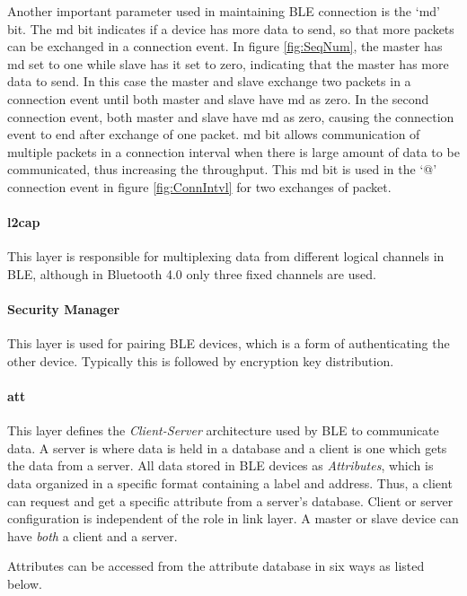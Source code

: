  
Another important parameter used in maintaining BLE connection is the `\gls{md}' bit. The \gls{md} bit indicates if a device has more data to send, so that more packets can be exchanged in a connection event. In figure \ref{fig:SeqNum}, the master has \gls{md} set to one while slave has it set to zero, indicating that the master has more data to send. In this case the master and slave exchange two packets in a connection event until both master and slave have \gls{md} as zero. In the second connection event, both master and slave have \gls{md} as zero, causing the connection event to end after exchange of one packet. \gls{md} bit allows communication of multiple packets in a connection interval when there is large amount of data to be communicated, thus increasing the throughput. This \gls{md} bit is used in the `@' connection event in figure \ref{fig:ConnIntvl} for two exchanges of packet.

\paragraph{\gls{l2cap}} This layer is responsible for multiplexing data from different logical channels in BLE, although in Bluetooth 4.0 only three fixed channels are used. 

\paragraph{Security Manager} This layer is used for pairing BLE devices, which is a form of authenticating the other device. Typically this is followed by encryption key distribution.

\paragraph{\gls{att}} This layer defines the \emph{Client-Server} architecture used by BLE to communicate data. A server is where data is held in a database and a client is one which gets the data from a server. All data stored in BLE devices as \emph{Attributes}, which is data organized in a specific format containing a label and address. Thus, a client can request and get a specific attribute from a server's database. Client or server configuration is independent of the role in link layer. A master or slave device can have \emph{both} a client and a server.

Attributes can be accessed from the attribute database in six ways as listed below.

